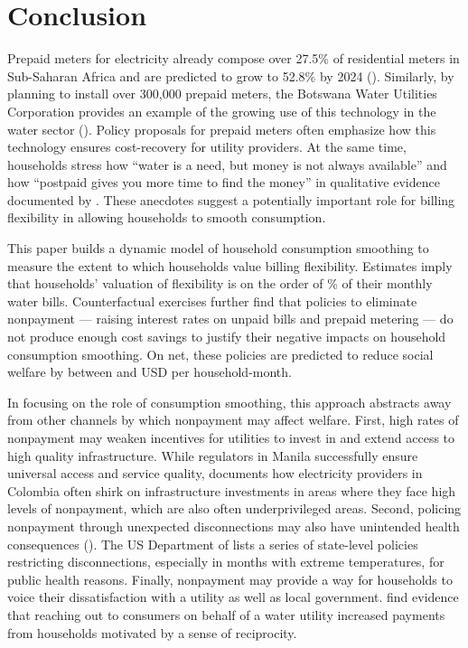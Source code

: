 \documentclass[12pt]{article}
\begin{document}

\section{Conclusion}\label{section:conclusion}

Prepaid meters for electricity already compose over 27.5\% of residential meters in Sub-Saharan Africa and are predicted to grow to 52.8\% by 2024 (\cite{northeast2014}).  Similarly, by planning to install over 300,000 prepaid meters, the Botswana Water Utilities Corporation provides an example of the growing use of this technology in the water sector (\cite{heymans2014limits}).  Policy proposals for prepaid meters often emphasize how this technology ensures cost-recovery for utility providers.  At the same time, households stress how ``water is a need, but money is not always available'' and  how ``postpaid gives you more time to find the money'' in qualitative evidence documented by \cite{heymans2014limits}.  These anecdotes suggest a potentially important role for billing flexibility in allowing households to smooth consumption.  

This paper builds a dynamic model of household consumption smoothing to measure the extent to which households value billing flexibility.  Estimates imply that households' valuation of flexibility is on the order of \unskip\% of their monthly water bills.  Counterfactual exercises further find that policies to eliminate nonpayment --- raising interest rates on unpaid bills and prepaid metering --- do not produce enough cost savings to justify their negative impacts on household consumption smoothing.  On net, these policies are predicted to reduce social welfare by between and USD per household-month.  

In focusing on the role of consumption smoothing, this approach abstracts away from other channels by which nonpayment may affect welfare.  First, high rates of nonpayment may weaken incentives for utilities to invest in and extend access to high quality infrastructure.  While regulators in Manila successfully ensure universal access and service quality, \cite{mcrae2015infrastructure} documents how electricity providers in Colombia often shirk on infrastructure investments in areas where they face high levels of nonpayment, which are also often underprivileged areas.  Second, policing nonpayment through unexpected disconnections may also have unintended health consequences (\cite{franklin2017}).  The US Department of \cite{liheap} lists a series of state-level policies restricting disconnections, especially in months with extreme temperatures, for public health reasons.  Finally, nonpayment may provide a way for households to voice their dissatisfaction with a utility as well as local government.  \cite{szabo2015reducing} find evidence that reaching out to consumers on behalf of a water utility increased payments from households motivated by a sense of reciprocity.  
\end{document}
